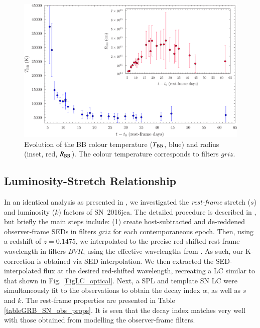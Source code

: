\documentclass[traditabstract,longauth]{aa}
\begin{document}
 



\begin{figure}
   \includegraphics[width=\columnwidth]{Fig11_SED_T_R-eps-converted-to.pdf}
      \caption{Evolution of the BB colour temperature ($T_{\rm BB}$, blue) and radius (inset, red, $R_{\rm BB}$).  The colour temperature corresponds to filters $griz$.}
   \label{Figtemp}
\end{figure}

   


\subsection{Luminosity-Stretch Relationship}
\label{secksrelation}




In an identical analysis as presented in \citet{Cano14}, we investigated the \emph{rest-frame} stretch ($s$) and luminosity ($k$) factors of SN~2016jca.  The detailed procedure is described in \citet{Cano14}, but briefly the main steps include: (1) create host-subtracted and de-reddened observer-frame SEDs in filters $griz$ for each contemporaneous epoch.  Then, using a redshift of $z=0.1475$, we interpolated to the precise red-shifted rest-frame wavelength in filters $BVR$, using the effective wavelengths from \citet{Fukugita95}.  As such, our K-correction is obtained via SED interpolation.  We then extracted the SED-interpolated flux at the desired red-shifted wavelength, recreating a LC similar to that shown in Fig. \ref{FigLC_optical}.  Next, a SPL and template SN LC were simultaneously fit to the observations to obtain the decay index $\alpha$, as well as $s$ and $k$.  The rest-frame properties are presented in Table \ref{tableGRB_SN_obs_props}.  It is seen that the decay index matches very well with those obtained from modelling the observer-frame filters.
\end{document}
